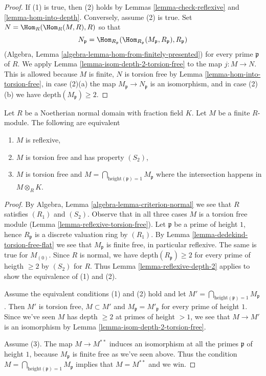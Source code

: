 \begin{proof}
If (1) is true, then (2) holds by
Lemmas \ref{lemma-check-reflexive} and \ref{lemma-hom-into-depth}.
Conversely, assume (2) is true. Set $N = \Hom_R(\Hom_R(M, R), R)$
so that
$$
N_\mathfrak p =
\Hom_{R_\mathfrak p}(
\Hom_{R_\mathfrak p}(M_\mathfrak p, R_\mathfrak p), R_\mathfrak p)
$$
(Algebra, Lemma \ref{algebra-lemma-hom-from-finitely-presented})
for every prime $\mathfrak p$ of $R$.
We apply Lemma \ref{lemma-isom-depth-2-torsion-free} to the map $j : M \to N$.
This is allowed because $M$ is finite, $N$ is torsion free by
Lemma \ref{lemma-hom-into-torsion-free},
in case (2)(a) the map
$M_\mathfrak p \to N_\mathfrak p$ is an isomorphism, and
in case (2)(b) we have $\text{depth}(M_\mathfrak p) \geq 2$.
\end{proof}

\begin{lemma}
\label{lemma-reflexive-over-normal}
Let $R$ be a Noetherian normal domain with fraction field $K$.
Let $M$ be a finite $R$-module. The following are equivalent
\begin{enumerate}
\item $M$ is reflexive,
\item $M$ is torsion free and has property $(S_2)$,
\item $M$ is torsion free and
$M = \bigcap_{\text{height}(\mathfrak p) = 1} M_{\mathfrak p}$
where the intersection happens in $M \otimes_R K$.
\end{enumerate}
\end{lemma}

\begin{proof}
By Algebra, Lemma \ref{algebra-lemma-criterion-normal}
we see that $R$ satisfies $(R_1)$ and $(S_2)$.
Observe that in all three cases $M$ is a torsion free module
(Lemma \ref{lemma-reflexive-torsion-free}).
Let $\mathfrak p$ be a prime of height $1$, hence
$R_\mathfrak p$ is a discrete valuation ring by $(R_1)$. By
Lemma \ref{lemma-dedekind-torsion-free-flat}
we see that $M_\mathfrak p$ is finite free, in particular
reflexive. The same is true for $M_{(0)}$.
Since $R$ is normal, we have $\text{depth}(R_\mathfrak p) \geq 2$
for every prime of heigth $\geq 2$ by $(S_2)$ for $R$.
Thus Lemma \ref{lemma-reflexive-depth-2}
applies to show the equivalence of (1) and (2).

\medskip\noindent
Assume the equivalent conditions (1) and (2) hold
and let $M' = \bigcap_{\text{height}(\mathfrak p) = 1} M_{\mathfrak p}$.
Then $M'$ is torsion free, $M \subset M'$ and
$M_\mathfrak p = M'_\mathfrak p$ for every prime of height $1$.
Since we've seen $M$ has depth $\geq 2$ at primes of height $> 1$,
we see that $M \to M'$ is an isomorphism by
Lemma \ref{lemma-isom-depth-2-torsion-free}.

\medskip\noindent
Assume (3). The map $M \to M^{**}$ induces an isomorphism at all
the primes $\mathfrak p$ of height $1$, because $M_\mathfrak p$
is finite free as we've seen above. Thus the condition
$M = \bigcap_{\text{height}(\mathfrak p) = 1} M_{\mathfrak p}$
implies that $M = M^{**}$ and we win.
\end{proof}

